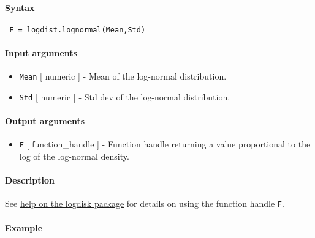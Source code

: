 


	\paragraph{Syntax}
 
 \begin{verbatim}
 F = logdist.lognormal(Mean,Std)
 \end{verbatim}
 
 \paragraph{Input arguments}
 
 \begin{itemize}
 \item
   \texttt{Mean} {[} numeric {]} - Mean of the log-normal distribution.
 \item
   \texttt{Std} {[} numeric {]} - Std dev of the log-normal distribution.
 \end{itemize}
 
 \paragraph{Output arguments}
 
 \begin{itemize}
 \item
   \texttt{F} {[} function\_handle {]} - Function handle returning a
   value proportional to the log of the log-normal density.
 \end{itemize}
 
 \paragraph{Description}
 
 See \href{logdist/Contents}{help on the logdisk package} for details on
 using the function handle \texttt{F}.
 
 \paragraph{Example}


